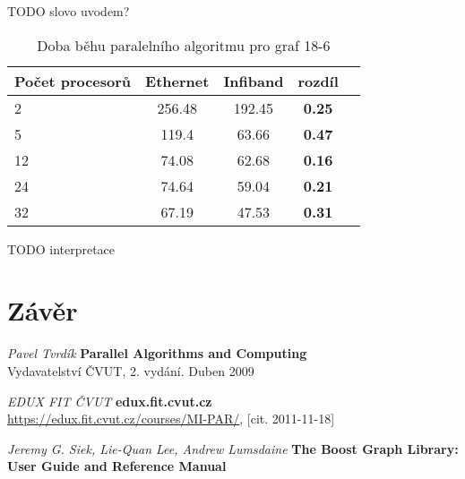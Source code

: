\documentclass[]{article}
\begin{document}
TODO slovo uvodem?

\begin{table}[ht]
\centering
\begin{tabular}{|l|c|c|c|c|}
\hline \textbf{Počet procesorů} & \textbf{Ethernet} & \textbf{Infiband} & \textbf{rozdíl} \\
\hline 
\hline 2 & 256.48 & 192.45 & \textbf{0.25} \\ 
\hline 5 & 119.4 & 63.66 & \textbf{0.47} \\ 
\hline 12 & 74.08 & 62.68 &  \textbf{0.16} \\ 
\hline 24 & 74.64 & 59.04 &  \textbf{0.21} \\ 
\hline 32 & 67.19 & 47.53 &  \textbf{0.31} \\ 
\hline 
\end{tabular}
\caption{Doba běhu paralelního algoritmu pro graf 18-6}
\label{sekvencni_test}	
\end{table}

TODO interpretace


\section{Závěr}

\newpage
\begin{thebibliography}{9}

{\em Pavel Tvrdík}
       {\bf Parallel Algorithms and Computing}\\
		Vydavatelství ČVUT, 2. vydání. Duben 2009

{\em EDUX FIT ČVUT}
       {\bf edux.fit.cvut.cz}\\
       \url{https://edux.fit.cvut.cz/courses/MI-PAR/}, [cit. 2011-11-18]
       
{\em Jeremy G. Siek, Lie-Quan Lee, Andrew Lumsdaine }
       {\bf The Boost Graph Library: User Guide and Reference Manual}\\
       
       
 \end{thebibliography}
\end{document}
